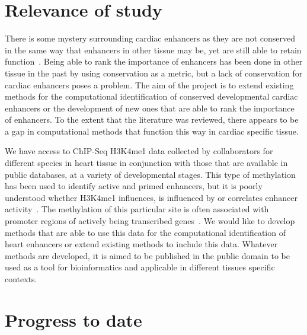 \documentclass[12pt,a4paper]{article}
\begin{document}
            
        
    \section{Relevance of study}
        There is some mystery surrounding cardiac enhancers as they are not conserved in the same way that enhancers in other tissue may be, yet are still able to retain function~\cite{blow2010chip}. Being able to rank the importance of enhancers has been done in other tissue in the past by using conservation as a metric, but a lack of conservation for cardiac enhancers poses a problem.
        The aim of the project is to extend existing methods for the computational identification of conserved developmental cardiac enhancers or the development of new ones that are able to rank the importance of enhancers. To the extent that the literature was reviewed, there appears to be a gap in computational methods that function this way in cardiac specific tissue.
        
        We have access to ChIP-Seq H3K4me1 data collected by collaborators for different species in heart tissue in conjunction with those that are available in public databases, at a variety of developmental stages. This type of methylation has been used to identify active and primed enhancers, but it is poorly understood whether H3K4me1 influences, is influenced by or correlates enhancer activity~\cite{rada2018h3k4me1}. The methylation of this particular site is often associated with promoter regions of actively being transcribed genes~\cite{barski2007high}. We would like to develop methods that are able to use this data for the computational identification of heart enhancers or extend existing methods to include this data. Whatever methods are developed, it is aimed to be published in the public domain to be used as a tool for bioinformatics and applicable in different tissues specific contexts.  
        
    \section{Progress to date}
    
    
\end{document}
